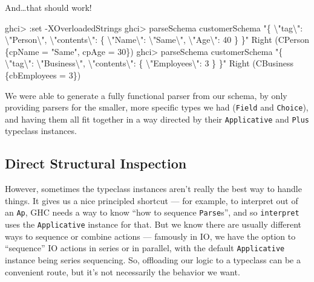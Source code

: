 \documentclass[]{article}
\newenvironment{Shaded}{}{}
\newcommand{\DataTypeTok}[1]{\textcolor[rgb]{0.56,0.13,0.00}{#1}}
\newcommand{\DecValTok}[1]{\textcolor[rgb]{0.25,0.63,0.44}{#1}}
\newcommand{\NormalTok}[1]{#1}
\newcommand{\OperatorTok}[1]{\textcolor[rgb]{0.40,0.40,0.40}{#1}}
\newcommand{\OtherTok}[1]{\textcolor[rgb]{0.00,0.44,0.13}{#1}}
\newcommand{\StringTok}[1]{\textcolor[rgb]{0.25,0.44,0.63}{#1}}
\begin{document}
And\ldots that should work!

\begin{Shaded}
\begin{Highlighting}[]
\NormalTok{ghci}\OperatorTok{\textgreater{}} \OperatorTok{:}\NormalTok{set }\OperatorTok{{-}}\DataTypeTok{XOverloadedStrings}
\NormalTok{ghci}\OperatorTok{\textgreater{}}\NormalTok{ parseSchema customerSchema  }\StringTok{"\{ \textbackslash{}"tag\textbackslash{}": \textbackslash{}"Person\textbackslash{}", \textbackslash{}"contents\textbackslash{}": \{ \textbackslash{}"Name\textbackslash{}": \textbackslash{}"Same\textbackslash{}", \textbackslash{}"Age\textbackslash{}": 40 \} \}"}
\DataTypeTok{Right}\NormalTok{ (}\DataTypeTok{CPerson}\NormalTok{ \{cpName }\OtherTok{=} \StringTok{"Same"}\NormalTok{, cpAge }\OtherTok{=} \DecValTok{30}\NormalTok{\})}
\NormalTok{ghci}\OperatorTok{\textgreater{}}\NormalTok{ parseSchema customerSchema  }\StringTok{"\{ \textbackslash{}"tag\textbackslash{}": \textbackslash{}"Business\textbackslash{}", \textbackslash{}"contents\textbackslash{}": \{ \textbackslash{}"Employees\textbackslash{}": 3 \} \}"}
\DataTypeTok{Right}\NormalTok{ (}\DataTypeTok{CBusiness}\NormalTok{ \{cbEmployees }\OtherTok{=} \DecValTok{3}\NormalTok{\})}
\end{Highlighting}
\end{Shaded}

We were able to generate a fully functional parser from our schema, by only
providing parsers for the smaller, more specific types we had (\texttt{Field}
and \texttt{Choice}), and having them all fit together in a way directed by
their \texttt{Applicative} and \texttt{Plus} typeclass instances.

\subsection{Direct Structural Inspection}\label{direct-structural-inspection}

However, sometimes the typeclass instances aren't really the best way to handle
things. It gives us a nice principled shortcut --- for example, to interpret out
of an \texttt{Ap}, GHC needs a way to know ``how to sequence \texttt{Parse}s'',
and so \texttt{interpret} uses the \texttt{Applicative} instance for that. But
we know there are usually different ways to sequence or combine actions ---
famously in IO, we have the option to ``sequence'' IO actions in series or in
parallel, with the default \texttt{Applicative} instance being series
sequencing. So, offloading our logic to a typeclass can be a convenient route,
but it's not necessarily the behavior we want.
\end{document}
